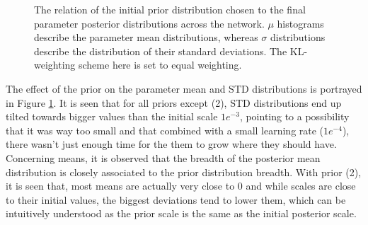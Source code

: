 \begin{figure}[H]
	\centering
	

	

	
	\caption{The relation of the initial prior distribution chosen to the final  parameter posterior distributions across the network. $\mu$ histograms describe the parameter mean distributions, whereas $\sigma$ distributions describe the distribution of their standard deviations. The KL-weighting scheme here is set to equal weighting.}
	\label{fig:bcnn-prior-weights}
\end{figure}

The effect of the prior on the parameter mean and STD distributions is portrayed in Figure \ref{fig:bcnn-prior-weights}. It is seen that for all priors except (2), STD distributions end up tilted towards bigger values than the initial scale $1e^{-3}$, pointing to a possibility that it was way too small and that combined with a small learning rate ($1e^{-4}$), there wasn't just enough time for the them to grow where they should have. Concerning means, it is observed that the breadth of the posterior mean distribution is closely associated to the prior distribution breadth. With prior (2), it is seen that, most means are actually very close to 0 and while scales are close to their initial values, the biggest deviations tend to lower them, which can be intuitively understood as the prior scale is the same as the initial posterior scale.  

